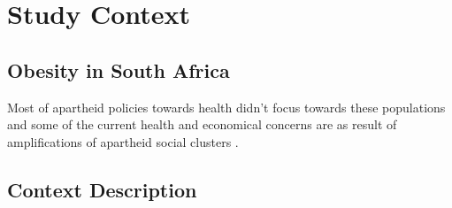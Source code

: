 
\chapter{Study Context} %

\label{contextchapter} %


\section{Obesity in South Africa}
Most of apartheid policies towards health didn't focus towards these populations and some of the current health and economical concerns are as result of amplifications of apartheid social clusters \citep{benatar2013challenges}. 
\section{Context Description}

\begin{flushright}
\end{flushright}
